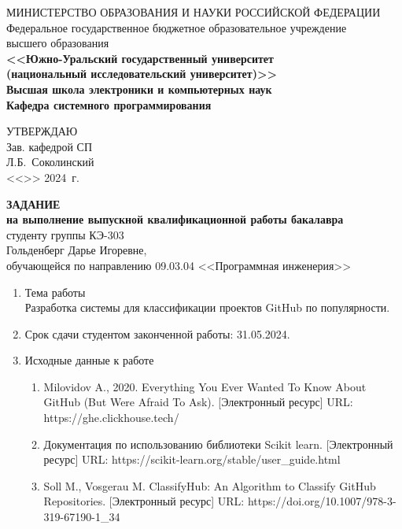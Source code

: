 \newpage
\thispagestyle{empty}

\begin{adjustwidth}{-1.5cm}{0.5cm}
\begin{linespread}{1}
\begin{center}


\small{
МИНИСТЕРСТВО ОБРАЗОВАНИЯ И НАУКИ РОССИЙСКОЙ ФЕДЕРАЦИИ\\
Федеральное государственное бюджетное образовательное учреждение\\
высшего образования\\
\textbf{<<Южно-Уральский государственный университет\\
(национальный исследовательский университет)>>\\
Высшая школа электроники и компьютерных наук\\
Кафедра системного программирования}
}



\vspace{2em}

\hfill{}
\parbox{7cm}{
УТВЕРЖДАЮ \\
Зав. кафедрой СП \\[0.5em]
\underfield{} Л.Б.~Соколинский \\[0.5em]
<<\underline{\qquad}>>\underfield{} 2024~г.
}

\vspace{2em}

\textbf{ЗАДАНИЕ} \\
\textbf{на выполнение выпускной квалификационной работы бакалавра}\\
студенту группы КЭ-303\\
Гольденберг Дарье Игоревне,\\
обучающейся по направлению 09.03.04 <<Программная инженерия>> 

\end{center}

\vspace{2em}

{
\small
\begin{enumerate}
	\bf\item Тема работы \rm \\
	Разработка системы для классификации проектов GitHub по популярности.
	\bf\item Срок сдачи студентом законченной работы: \rm
	31.05.2024.

	\bf\item Исходные данные к работе\rm
	\begin{enumerate}%
		\raggedright
		\item Milovidov A., 2020. Everything You Ever Wanted To Know About GitHub (But Were Afraid To Ask). [Электронный ресурс] URL: https://ghe.clickhouse.tech/
        \item Документация по использованию библиотеки Scikit learn. [Электронный ресурс] URL: https://scikit-learn.org/stable/user\_guide.html 
        \item Soll M., Vosgerau M. ClassifyHub: An Algorithm to Classify GitHub Repositories. [Электронный ресурс] URL: https://doi.org/10.1007/978-3-319-67190-1\_34
	\end{enumerate}


\end{enumerate}}
\end{linespread}
\end{adjustwidth}
